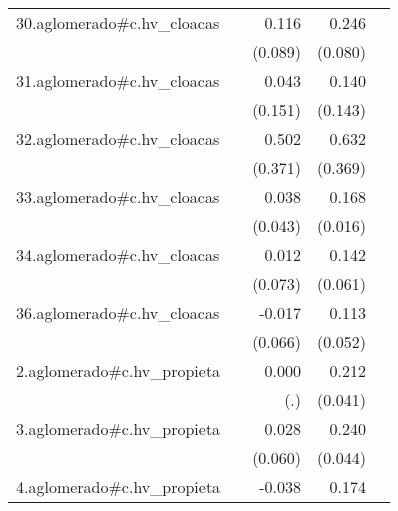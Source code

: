 {\begin{longtable}{l*{4}{D{.}{.}{-1}}}
\addlinespace
30.aglomerado#c.hv\_cloacas&                     &       0.116         &       0.246\sym{**} &                     \\
            &                     &     (0.089)         &     (0.080)         &                     \\
\addlinespace
31.aglomerado#c.hv\_cloacas&                     &       0.043         &       0.140         &                     \\
            &                     &     (0.151)         &     (0.143)         &                     \\
\addlinespace
32.aglomerado#c.hv\_cloacas&                     &       0.502         &       0.632         &                     \\
            &                     &     (0.371)         &     (0.369)         &                     \\
\addlinespace
33.aglomerado#c.hv\_cloacas&                     &       0.038         &       0.168\sym{***}&                     \\
            &                     &     (0.043)         &     (0.016)         &                     \\
\addlinespace
34.aglomerado#c.hv\_cloacas&                     &       0.012         &       0.142\sym{*}  &                     \\
            &                     &     (0.073)         &     (0.061)         &                     \\
\addlinespace
36.aglomerado#c.hv\_cloacas&                     &      -0.017         &       0.113\sym{*}  &                     \\
            &                     &     (0.066)         &     (0.052)         &                     \\
\addlinespace
2.aglomerado#c.hv\_propieta&                     &       0.000         &       0.212\sym{***}&                     \\
            &                     &         (.)         &     (0.041)         &                     \\
\addlinespace
3.aglomerado#c.hv\_propieta&                     &       0.028         &       0.240\sym{***}&                     \\
            &                     &     (0.060)         &     (0.044)         &                     \\
\addlinespace
4.aglomerado#c.hv\_propieta&                     &      -0.038         &       0.174\sym{***}&                     \\

\end{longtable}}
